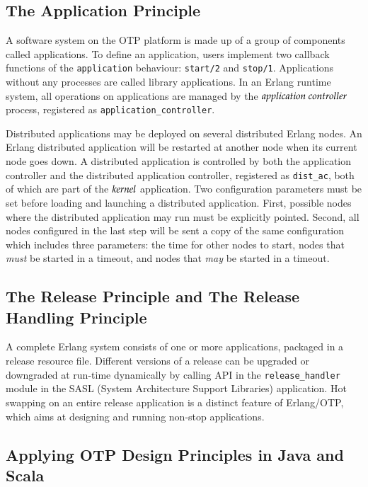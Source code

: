 \newpage
\subsection{The Application Principle}

A software system on the OTP platform is made up of a group of components 
called applications.  To define an application, users implement two callback 
functions of the {\tt application} behaviour: {\tt start/2} and {\tt stop/1}.  
Applications without any processes are called library applications.  
In an Erlang runtime system, all operations on applications are managed by the 
$\it{application\ controller}$ process, registered as {\tt application\_controller}.

Distributed applications may be deployed on several distributed Erlang nodes.  
An Erlang distributed application will be restarted at another node when its 
current node goes down.  A distributed application is controlled by both the 
application controller and the distributed application controller, registered as 
{\tt dist\_ac}, both of which are part of the $\it{kernel}$  
application.  Two configuration parameters must be set before loading and 
launching a distributed application.  First, possible nodes where the 
distributed application may run must be explicitly pointed.  Second, all nodes 
configured in the last step will be sent a copy of the same configuration which 
includes three parameters: the time for other nodes to start, nodes that {\it 
must} be started in a timeout, and nodes that {\it may} be started in a 
timeout.


\subsection{The Release Principle and The Release Handling Principle}

A complete Erlang system consists of one or more applications, packaged in a 
release resource file.  Different versions of a release can be upgraded or 
downgraded at run-time dynamically by calling API in the {\tt release\_handler} 
module in the SASL (System Architecture Support Libraries) application.  Hot 
swapping on an entire release application is a distinct feature of Erlang/OTP, 
which aims at designing and running non-stop applications.


\subsection{Applying OTP Design Principles in Java and Scala}

